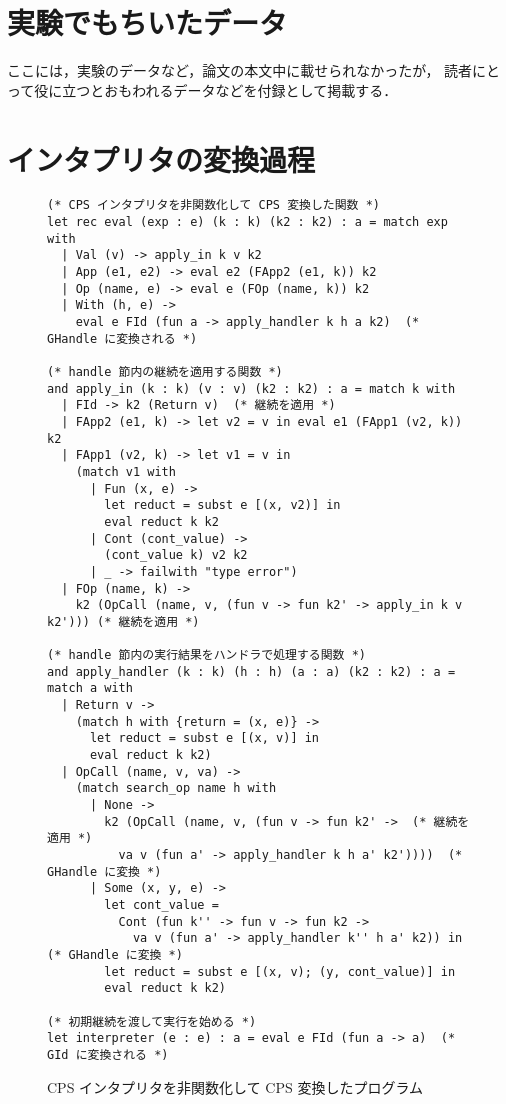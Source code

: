 \chapter{実験でもちいたデータ}

ここには，実験のデータなど，論文の本文中に載せられなかったが，
読者にとって役に立つとおもわれるデータなどを付録として掲載する．

\chapter{インタプリタの変換過程}

\begin{figure}
\begin{verbatim}
(* CPS インタプリタを非関数化して CPS 変換した関数 *)
let rec eval (exp : e) (k : k) (k2 : k2) : a = match exp with
  | Val (v) -> apply_in k v k2
  | App (e1, e2) -> eval e2 (FApp2 (e1, k)) k2
  | Op (name, e) -> eval e (FOp (name, k)) k2
  | With (h, e) ->
    eval e FId (fun a -> apply_handler k h a k2)  (* GHandle に変換される *)

(* handle 節内の継続を適用する関数 *)
and apply_in (k : k) (v : v) (k2 : k2) : a = match k with
  | FId -> k2 (Return v)  (* 継続を適用 *)
  | FApp2 (e1, k) -> let v2 = v in eval e1 (FApp1 (v2, k)) k2
  | FApp1 (v2, k) -> let v1 = v in
    (match v1 with
      | Fun (x, e) ->
        let reduct = subst e [(x, v2)] in
        eval reduct k k2
      | Cont (cont_value) ->
        (cont_value k) v2 k2
      | _ -> failwith "type error")
  | FOp (name, k) ->
    k2 (OpCall (name, v, (fun v -> fun k2' -> apply_in k v k2'))) (* 継続を適用 *)

(* handle 節内の実行結果をハンドラで処理する関数 *)
and apply_handler (k : k) (h : h) (a : a) (k2 : k2) : a = match a with
  | Return v ->
    (match h with {return = (x, e)} ->
      let reduct = subst e [(x, v)] in
      eval reduct k k2)
  | OpCall (name, v, va) ->
    (match search_op name h with
      | None ->
        k2 (OpCall (name, v, (fun v -> fun k2' ->  (* 継続を適用 *)
          va v (fun a' -> apply_handler k h a' k2'))))  (* GHandle に変換 *)
      | Some (x, y, e) ->
        let cont_value =
          Cont (fun k'' -> fun v -> fun k2 ->
            va v (fun a' -> apply_handler k'' h a' k2)) in  (* GHandle に変換 *)
        let reduct = subst e [(x, v); (y, cont_value)] in
        eval reduct k k2)

(* 初期継続を渡して実行を始める *)
let interpreter (e : e) : a = eval e FId (fun a -> a)  (* GId に変換される *)
\end{verbatim}
\caption{CPS インタプリタを非関数化して CPS 変換したプログラム}
\label{figure:3cps}
\end{figure}

